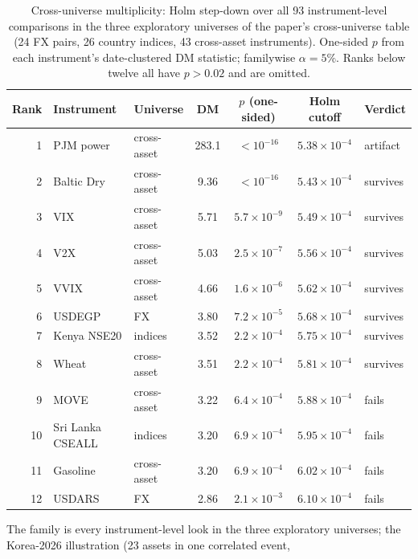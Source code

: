 \documentclass[11pt]{article}
\begin{document}
\begin{table}[htbp]
\centering
\begin{threeparttable}
\caption{Cross-universe multiplicity: Holm step-down over all 93
instrument-level comparisons in the three exploratory universes of the
paper's cross-universe table (24 FX pairs, 26 country indices, 43
cross-asset instruments). One-sided $p$ from each instrument's date-clustered DM
statistic; familywise $\alpha=5\%$. Ranks below twelve all have
$p>0.02$ and are omitted.}
\label{tab:holm}
\footnotesize\setlength{\tabcolsep}{5pt}
\begin{tabular}{rllcccl}
\toprule
Rank & Instrument & Universe & DM & $p$ (one-sided) & Holm cutoff & Verdict \\
\midrule
1 & PJM power\tnote{a} & cross-asset & 283.1 & $<10^{-16}$ & $5.38\times10^{-4}$ & artifact\tnote{a} \\
2 & Baltic Dry & cross-asset & 9.36 & $<10^{-16}$ & $5.43\times10^{-4}$ & survives \\
3 & VIX & cross-asset & 5.71 & $5.7\times10^{-9}$ & $5.49\times10^{-4}$ & survives \\
4 & V2X & cross-asset & 5.03 & $2.5\times10^{-7}$ & $5.56\times10^{-4}$ & survives \\
5 & VVIX & cross-asset & 4.66 & $1.6\times10^{-6}$ & $5.62\times10^{-4}$ & survives \\
6 & USDEGP & FX & 3.80 & $7.2\times10^{-5}$ & $5.68\times10^{-4}$ & survives \\
7 & Kenya NSE20 & indices & 3.52 & $2.2\times10^{-4}$ & $5.75\times10^{-4}$ & survives \\
8 & Wheat & cross-asset & 3.51 & $2.2\times10^{-4}$ & $5.81\times10^{-4}$ & survives \\
9 & MOVE & cross-asset & 3.22 & $6.4\times10^{-4}$ & $5.88\times10^{-4}$ & fails \\
10 & Sri Lanka CSEALL & indices & 3.20 & $6.9\times10^{-4}$ & $5.95\times10^{-4}$ & fails \\
11 & Gasoline & cross-asset & 3.20 & $6.9\times10^{-4}$ & $6.02\times10^{-4}$ & fails \\
12 & USDARS & FX & 2.86 & $2.1\times10^{-3}$ & $6.10\times10^{-4}$ & fails \\
\bottomrule
\end{tabular}
\begin{tablenotes}\footnotesize
\item The family is every instrument-level look in the three
exploratory universes; the Korea-2026 illustration (23 assets in one correlated event,

\end{tablenotes}
\end{threeparttable}
\end{table}
\end{document}
